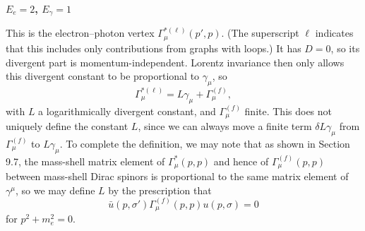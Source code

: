 \par\noindent\textbf{$E_e=2$, $E_\gamma=1$}\par
This is the electron--photon vertex $\Gamma_\mu^{*(\ell)}(p',p)$. (The
superscript $\ell$ indicates that this includes only contributions from
graphs with loops.) It has $D=0$, so its divergent part is
momentum-independent. Lorentz invariance then only allows this divergent
constant to be proportional to $\gamma_\mu$, so
\begin{equation}
  \Gamma_\mu^{*(\ell)}=L\gamma_\mu+\Gamma_\mu^{(f)},
  \tag{12.2.1}\label{eq:12.2.1}
\end{equation}
with $L$ a logarithmically divergent constant, and $\Gamma_\mu^{(f)}$ finite.
This does not uniquely define the constant $L$, since we can always move a
finite term $\delta L\gamma_\mu$ from $\Gamma_\mu^{(f)}$ to $L\gamma_\mu$. To
complete the definition, we may note that as shown in Section 9.7, the
mass-shell matrix element of $\Gamma_\mu^*(p,p)$ and hence of
$\Gamma_\mu^{(f)}(p,p)$ between mass-shell Dirac spinors is proportional to
the same matrix element of $\gamma^\mu$, so we may define $L$ by the
prescription that
\begin{equation}
  \bar u(p,\sigma')\Gamma_\mu^{(f)}(p,p)u(p,\sigma)=0
  \tag{12.2.2}\label{eq:12.2.2}
\end{equation}
for $p^2+m_e^2=0$.

